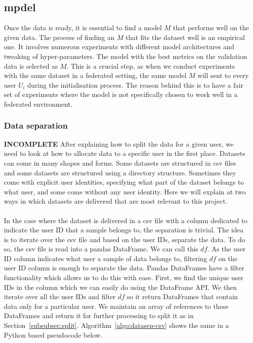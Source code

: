 \documentclass[12pt]{article}
\begin{document}
\subsection{mpdel}
Once the data is ready, it is essential to find a model $M$ that performs well on the given data. The process of finding an $M$ that fits the dataset well is an empirical one. It involves numerous experiments with different model architectures and tweaking of hyper-parameters. The model with the best metrics on the validation data is selected as $M$. This is a crucial step, as when we conduct experiments with the same dataset in a federated setting, the same model $M$ will sent to every user $U_i$ during the initialisation process. The reason behind this is to have a fair set of experiments where the model is not specifically chosen to work well in a federated environment. 
\subsubsection{Data separation}\label{subsubsec:datasep}
\textbf{\LARGE INCOMPLETE}
After explaining how to split the data for a given user, we need to look at how to allocate data to a specific user in the first place. Datasets can come in many shapes and forms. Some datasets are structured in csv files and some datasets are structured using a directory structure. Sometimes they come with explicit user identities, specifying what part of the dataset belongs to what user, and some come without any user identity. Here we will explain at two ways in which datasets are delivered that are most relevant to this project.
\\\\
In the case where the dataset is delivered in a csv file with a column dedicated to indicate the user ID that a sample belongs to, the separation is trivial. The idea is to iterate over the csv file and based on the user IDs, separate the data. To do so, the csv file is read into a pandas DataFrame. We can call this $df$. As the user ID column indicates what user a sample of data belongs to, filtering $df$ on the user ID column is enough to separate the data. Pandas DataFrames have a filter functionality which allows us to do this with ease. First, we find the unique user IDs in the column which we can easily do using the DataFrame API. We then iterate over all the user IDs and filter $df$ so it return DataFrames that contain data only for a particular user. We maintain an array of references to these DataFrames and return it for further processing to split it as in Section~\ref{subsubsec:split}. Algorithm~\ref{algo:datasep-csv} shows the same in a Python based pseudocode below.
\end{document}
